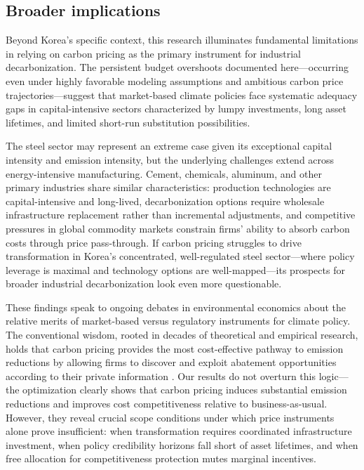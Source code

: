\documentclass[preprint,1p,authoryear]{elsarticle}
\begin{document}
\subsection{Broader implications}

Beyond Korea's specific context, this research illuminates fundamental limitations in relying on carbon pricing as the primary instrument for industrial decarbonization. The persistent budget overshoots documented here—occurring even under highly favorable modeling assumptions and ambitious carbon price trajectories—suggest that market-based climate policies face systematic adequacy gaps in capital-intensive sectors characterized by lumpy investments, long asset lifetimes, and limited short-run substitution possibilities.

The steel sector may represent an extreme case given its exceptional capital intensity and emission intensity, but the underlying challenges extend across energy-intensive manufacturing. Cement, chemicals, aluminum, and other primary industries share similar characteristics: production technologies are capital-intensive and long-lived, decarbonization options require wholesale infrastructure replacement rather than incremental adjustments, and competitive pressures in global commodity markets constrain firms' ability to absorb carbon costs through price pass-through. If carbon pricing struggles to drive transformation in Korea's concentrated, well-regulated steel sector—where policy leverage is maximal and technology options are well-mapped—its prospects for broader industrial decarbonization look even more questionable.

These findings speak to ongoing debates in environmental economics about the relative merits of market-based versus regulatory instruments for climate policy. The conventional wisdom, rooted in decades of theoretical and empirical research, holds that carbon pricing provides the most cost-effective pathway to emission reductions by allowing firms to discover and exploit abatement opportunities according to their private information \citep{fowlie2016carbon}. Our results do not overturn this logic—the optimization clearly shows that carbon pricing induces substantial emission reductions and improves cost competitiveness relative to business-as-usual. However, they reveal crucial scope conditions under which price instruments alone prove insufficient: when transformation requires coordinated infrastructure investment, when policy credibility horizons fall short of asset lifetimes, and when free allocation for competitiveness protection mutes marginal incentives.
\end{document}
